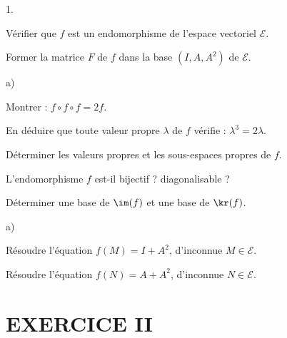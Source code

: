 \documentclass[11pt]{article}%
\begin{document}
\begin{noliste}{1.}
\setcounter{enumi}{6}
\item Vérifier que $f$ est un endomorphisme de l'espace vectoriel 
$\mathcal{E}$.



\item Former la matrice $F$ de $f$ dans la base $(I,A,A^2)$ de 
$\mathcal{E}$.



\item
\begin{noliste}{a)}
\item Montrer : $f\circ f\circ f=2f$.




\item En déduire que toute valeur propre $\lambda$ de $f$ vérifie : 
$\lambda^3=2\lambda$.



\item Déterminer les valeurs propres et les sous-espaces propres de $f$.


\end{noliste}

\item L'endomorphisme $f$ est-il bijectif ? diagonalisable ?



\item Déterminer une base de $\im(f)$ et une base de 
$\kr(f)$.



\item 
\begin{noliste}{a)}
\item Résoudre l'équation $f(M)=I+A^2$, d'inconnue $M\in \mathcal{E}$.






\item Résoudre l'équation $f(N)=A+A^2$, d'inconnue $N\in \mathcal{E}$.



\end{noliste}
\end{noliste}




\section*{EXERCICE II}
\end{document}
